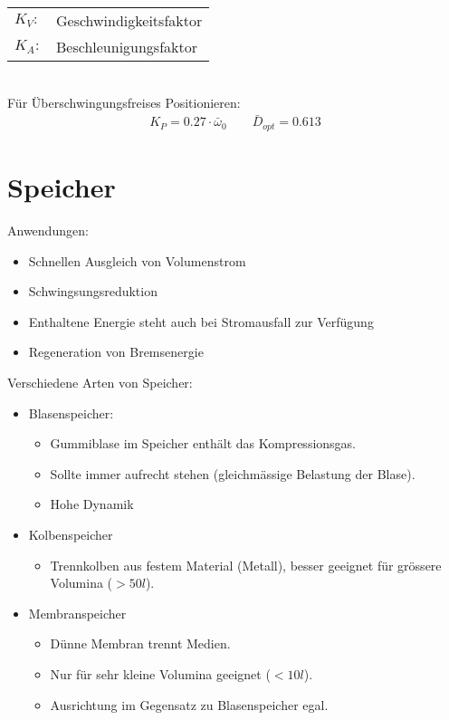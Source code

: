 \documentclass[landscape,a4paper,10pt]{article}
\begin{document}
\begin{multicols*}{3}
\begin{tabular}{ll}
$K_V:$ & Geschwindigkeitsfaktor \\
$K_A:$ & Beschleunigungsfaktor
\end{tabular}\\

Für Überschwingungsfreises Positionieren:
\begin{align*}
K_P = 0.27 \cdot \bar{\omega}_0 \qquad \bar{D}_{opt} = 0.613
\end{align*}



\section{Speicher}
Anwendungen:\begin{itemize}
\item Schnellen Ausgleich von Volumenstrom 
\item Schwingsungsreduktion
\item Enthaltene Energie steht auch bei Stromausfall zur Verfügung
\item Regeneration von Bremsenergie
\end{itemize}

Verschiedene Arten von Speicher:
\begin{itemize}
\item Blasenspeicher:
\begin{itemize}
\item Gummiblase im Speicher enthält das Kompressionsgas.
\item  Sollte immer aufrecht stehen (gleichmässige Belastung der Blase).
\item Hohe Dynamik
\end{itemize}
\item Kolbenspeicher
\begin{itemize}
\item Trennkolben aus festem Material (Metall), besser geeignet für grössere Volumina ($>50 l$). 
\end{itemize}
\item Membranspeicher
\begin{itemize}
\item Dünne Membran trennt Medien.
\item Nur für sehr kleine Volumina geeignet ($<10 l$). 
\item Ausrichtung im Gegensatz zu Blasenspeicher egal. 
\end{itemize}
\end{itemize}



\end{multicols*}
\end{document}
